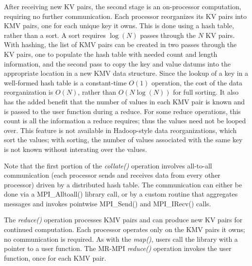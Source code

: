 After receiving new KV pairs, the second stage is an on-processor
computation, requiring no further communication.  Each processor
reorganizes its KV pairs into KMV pairs, one for each unique key it
owns.  This is done using a hash table, rather than a sort.  A sort
requires $\log(N)$ passes through the $N$ KV pairs.  With hashing,
the list of KMV
pairs can be created in two passes through the KV pairs, one to populate
the hash table with needed count and length information, and the
second pass to copy the key and value datums into the appropriate
location in a new KMV data structure.  Since the lookup of a key in a
well-formed hash table is a constant-time $O(1)$ operation, the cost
of the data reorganization is $O(N)$, rather than $O(N\log(N))$ for full
sorting.  It also has the added benefit that the number of values in each
KMV pair is known and is passed to the user function during a
reduce.  For some reduce operations, this count is all the information a
reduce requires; thus the values need not be looped over.  This feature is not
available in Hadoop-style data reorganizations, which sort the values; 
with sorting, the number of values associated with the same key is not known 
without interating over the values.

Note that the first portion of the {\it collate()} operation involves
all-to-all communication (each processor sends and receives data from
every other processor) driven by a distributed hash table.  The
communication can either be done via a MPI\_Alltoall() library call,
or by a custom routine that aggregates messages and invokes pointwise
MPI\_Send() and MPI\_IRecv() calls.

The {\it reduce()} operation processes KMV pairs and can produce new
KV pairs for continued computation.  Each processor operates only on
the KMV pairs it owns; no communication is required.  As with the {\it
map()}, users call the library with a pointer to a user function.  The
MR-MPI {\it reduce()} operation invokes the user function, once for
each KMV pair.

